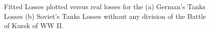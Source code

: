 \documentclass[]{article}
\begin{document}
\begin{figure}
\centering
{}\hspace{1pt}
\caption{Fitted Losses plotted versus real losses for the (a) German's Tanks Losses  (b) Soviet's Tanks Losses without any division of the Battle of Kursk of WW II.} 
\end{figure}
\end{document}
